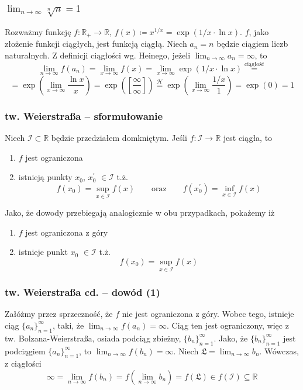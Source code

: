 \documentclass[11pt]{beamer}
\newcommand{\below}[1]{\displaystyle\mathop{#1}}
\begin{document}
\begin{frame}
\frametitle{$\lim_{n \rightarrow \infty}\sqrt[n]n = 1$}
Rozważmy funkcję $f: \mathbb{R_+} \rightarrow \mathbb{R}$, $f(x) \coloneqq x^{1/x} = \exp (1/x \cdot \ln x)$. $f$, jako złożenie funkcji ciągłych, jest funkcją ciągłą. Niech $a_n = n$ będzie ciągiem liczb naturalnych. Z definicji ciągłości wg. Heinego, jeżeli $\lim_{n \rightarrow \infty} a_n = \infty$, to 
\[
	\lim_{n \rightarrow \infty}f(a_n) = \lim_{x \rightarrow \infty}f(x) = \lim_{x\rightarrow \infty} \exp (1/x \cdot \ln x) \stackrel{\text{ciągłość}}{=} 
\]
\[
	= \exp \left(\lim_{x\rightarrow \infty}\frac{\ln x}x \right) = \exp\left(\left[\frac \infty \infty \right]\right) \stackrel{\mathcal{H}}{=} \exp \left( \lim_{x\rightarrow \infty}\frac{1/x}{1} \right) = \exp(0) = 1
\]
\end{frame}

\begin{frame}
\frametitle{tw. Weierstraßa -- sformułowanie}
Niech $\mathcal{I} \subset \mathbb{R}$ będzie przedziałem domkniętym. Jeśli $f:\mathcal{I} \rightarrow \mathbb{R}$ jest ciągła, to
\begin{enumerate}
\item $f$ jest ograniczona
\item istnieją punkty $x_0$, $x_0^\prime$ $\in \mathcal{I}$ t.ż.$$ f(x_0) = \below{\sup}_{x\in \mathcal{I}} f(x) \qquad \text{oraz}\qquad f(x_0^\prime) = \below{\inf}_{x\in\mathcal{I}}f(x)$$
\end{enumerate}

Jako, że dowody przebiegają analogicznie w obu przypadkach, pokażemy iż
\begin{enumerate}
\item $f$ jest ograniczona z góry
\item istnieje punkt $x_0$ $\in \mathcal{I}$ t.ż.$$ f(x_0) = \displaystyle\mathop{\sup}_{x\in \mathcal{I}} f(x)$$
\end{enumerate}

\end{frame}
\begin{frame}
\frametitle{tw. Weierstraßa cd. -- dowód (1)}
Załóżmy przez sprzeczność, że $f$ nie jest ograniczona z góry.  Wobec tego, istnieje ciąg $\{a_n\}_{n=1}^\infty$, taki, że $\lim_{n \rightarrow \infty} f(a_n) = \infty$. Ciąg ten jest ograniczony, więc z tw. Bolzana-Weierstraßa, osiada podciąg zbieżny, $\{b_n\}^{\infty}_{n=1}$.
Jako, że $\{b_n\}_{n=1}^\infty$ jest podciągiem $\{a_n\}_{n=1}^\infty$, to $\lim_{n \rightarrow \infty}f(b_n) = \infty$. Niech $\mathfrak{L} = \lim_{n \rightarrow \infty}b_n$. Wówczas, z ciągłości
\[
	\infty = \below{\lim}_{n \rightarrow \infty}f(b_n) = f(\below{\lim}_{n\rightarrow \infty}b_n) =  f(\mathfrak{L}) \in f(\mathcal{I}) \subseteq \mathbb{R}
\]
\end{frame}
\end{document}
